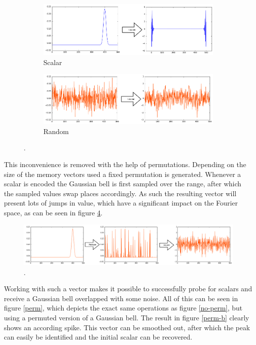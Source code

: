 \documentclass[conference]{IEEEtran}
\begin{document}
\begin{figure}
\begin{subfigure}{1\columnwidth}
\includegraphics[width=\columnwidth]{img/scalar-pre-perm-fft.png}
\caption{Scalar}
\label{fft-a}
\end{subfigure}
\begin{subfigure}{1\columnwidth}
\includegraphics[width=\columnwidth]{img/scalar-random-fft.png}
\caption{Random}
\label{fft-b}
\end{subfigure}
\caption{.}
\label{fft}
\end{figure}

This inconvenience is removed with the help of permutations. Depending on the size of the memory vectors used a fixed permutation is generated. Whenever a scalar is encoded the Gaussian bell is first sampled over the range, after which the sampled values swap places accordingly. As such the resulting vector will present lots of jumps in value, which have a significant impact on the Fourier space, as can be seen in figure \ref{perm-fft}.

\begin{figure}
\includegraphics[width=\columnwidth]{img/scalar-perm-step-fft.png}
\caption{.}
\label{perm-fft}
\end{figure}

Working with such a vector makes it possible to successfully probe for scalars and receive a Gaussian bell overlapped with some noise. All of this can be seen in figure \ref{perm}, which depicts the exact same operations as figure \ref{no-perm}, but using a permuted version of a Gaussian bell. The result in figure \ref{perm-b} clearly shows an according spike. This vector can be smoothed out, after which the peak can easily be identified and the initial scalar can be recovered.
\end{document}
